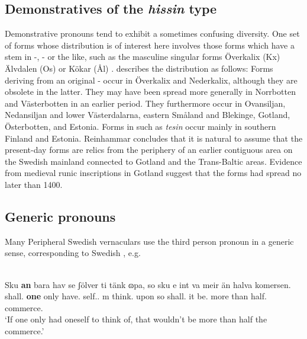 \subsection{Demonstratives of the \textit{hissin} type}

Demonstrative pronouns tend to exhibit a sometimes confusing diversity. One set of forms whose distribution is of interest here involves those forms which have a stem in -, - or the like, such as the masculine singular forms Överkalix (Kx) Älvdalen (Os) or Kökar (Ål) . \citet{Reinhammar1988} describes the distribution as follows: Forms deriving from an original - occur in Överkalix and Nederkalix, although they are obsolete in the latter. They may have been spread more  generally in Norrbotten and Västerbotten in an earlier period. They furthermore occur in Ovansiljan, Nedansiljan and lower Västerdalarna, eastern Småland and Blekinge, Gotland, Österbotten, and Estonia. Forms in  such as \textit{tesin} occur mainly in southern Finland and Estonia. Reinhammar concludes that it is natural to assume that the present-day forms are relics from the periphery of an earlier contiguous area on the Swedish mainland connected to Gotland and the Trans-Baltic areas. Evidence from medieval runic inscriptions in Gotland suggest that the forms had spread no later than 1400.

\subsection{Generic pronouns}

Many Peripheral Swedish vernaculars use the third person pronoun  in a generic sense, corresponding to Swedish , e.g.

\ea\label{}
\\
\gll Sku  \textbf{an} bara  hav  se  ʃölver  ti  tänk  ɷpa,  so sku  e  int  va  meir  än  halva  komersen.\\
shall.{\pst}  \textbf{one} only  have.{\inf}  {}  self.{\m}.{\sg}  {{\inf}m}  think.{\inf}  upon  so shall.{\pst}   it  {\neg}  be.{\inf}  more  than  half.{\wk}  commerce.{}\\ 
\glt ‘If one only had oneself to think of, that wouldn’t be more than half the commerce.’
\z

